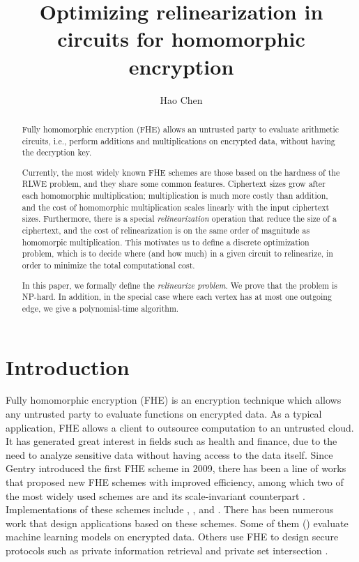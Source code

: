 \documentclass[11pt]{article} %
\title{Optimizing relinearization in circuits for homomorphic encryption}
\author[]{Hao Chen}
\affil{\small{Microsoft Research, Redmond WA, USA} \\

\texttt{haoche@microsoft.com}}
\date{}
\theoremstyle{plain}
\theoremstyle{definition}
\begin{document}
\maketitle  %


\begin{abstract}
Fully homomorphic encryption (FHE) allows an untrusted party to evaluate arithmetic circuits,  i.e., perform additions and multiplications on encrypted data, without having the decryption key. 


Currently, the most widely known FHE schemes are those based on the hardness of the RLWE problem, and they share some common features. Ciphertext sizes grow after each homomorphic multiplication; multiplication is much more costly than addition, and the cost of homomorphic multiplication scales linearly with the input ciphertext sizes. Furthermore, there is a special {\it relinearization} operation that reduce the size of a ciphertext, and the cost of relinearization is on the same order of magnitude as homomorpic multiplication. This motivates us to define a discrete optimization problem, which is to decide where (and how much) in a given circuit to relinearize,  in order to minimize the total computational cost. 

In this paper, we formally define the {\it relinearize problem}. We prove that the problem is NP-hard. In addition, in the special case where each vertex has at most one outgoing edge, we give a polynomial-time algorithm. 
\end{abstract}

\section{Introduction}

Fully homomorphic encryption (FHE) is an encryption technique which allows any untrusted party to evaluate functions on encrypted data.  As a typical application, FHE allows a client to outsource computation to an untrusted cloud. It has generated great interest in fields such as health and finance, due to the need to analyze sensitive data without having access to the data itself. Since Gentry introduced the first FHE scheme in 2009, there has been a line of works that proposed new FHE schemes with improved efficiency, among which two of the most widely used schemes are \cite{brakerski2014leveled} and its scale-invariant counterpart \cite{fan2012somewhat}. Implementations of these schemes include \cite{halevi2014algorithms}, \cite{chensimple}, and \cite{aguilar2016nfllib}. There has been numerous work that design applications based on these schemes. Some of them (\cite{gilad2016cryptonets,bos2017privacy}) evaluate machine learning models on encrypted data. Others use FHE to design secure protocols such as private information retrieval \cite{melchor2016xpir} and private set intersection \cite{chen2017fast}.
\end{document}
